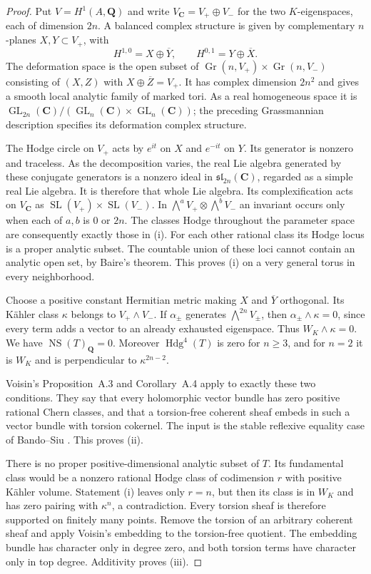\documentclass[11pt]{article}
\theoremstyle{definition}
\theoremstyle{remark}
\newcommand{\Q}{\mathbf Q}
\newcommand{\C}{\mathbf C}
\begin{document}
\begin{proof}
Put $V=H^1(A,\Q)$ and write
$V_\C=V_+\oplus V_-$ for the two $K$-eigenspaces, each of
dimension $2n$.  A balanced complex structure is given by
complementary $n$-planes $X,Y\subset V_+$, with
\[
 H^{1,0}=X\oplus\overline Y,
 \qquad H^{0,1}=Y\oplus\overline X.
\]
The deformation space is the open subset of
$\operatorname{Gr}(n,V_+)\times\operatorname{Gr}(n,V_-)$
consisting of $(X,Z)$ with $X\oplus\overline Z=V_+$.
It has complex dimension $2n^2$ and gives a smooth local analytic
family of marked tori.  As a real homogeneous space it is
$\operatorname{GL}_{2n}(\C)/
(\operatorname{GL}_n(\C)\times\operatorname{GL}_n(\C))$;
the preceding Grassmannian description specifies its deformation
complex structure.

The Hodge circle on $V_+$ acts by $e^{it}$ on $X$ and $e^{-it}$
on $Y$.  Its generator is nonzero and traceless.  As the
decomposition varies, the real Lie algebra generated by these
conjugate generators is a nonzero ideal in
$\mathfrak{sl}_{2n}(\C)$, regarded as a simple real Lie algebra.
It is therefore that whole Lie algebra.  Its complexification
acts on $V_\C$ as
$\operatorname{SL}(V_+)\times\operatorname{SL}(V_-)$.
In $\bigwedge^a V_+\otimes\bigwedge^b V_-$ an invariant occurs
only when each of $a,b$ is $0$ or $2n$.  The classes Hodge
throughout the parameter space are consequently exactly those
in (i).  For each other rational class its Hodge locus is a
proper analytic subset.  The countable union of these loci
cannot contain an analytic open set, by Baire's theorem.
This proves (i) on a very general torus in every neighborhood.

Choose a positive constant Hermitian metric making $X$ and
$\overline Y$ orthogonal.  Its Kähler class $\kappa$ belongs
to $V_+\wedge V_-$.  If $\alpha_\pm$ generates
$\bigwedge^{2n}V_\pm$, then
$\alpha_\pm\wedge\kappa=0$, since every term adds a vector
to an already exhausted eigenspace.  Thus $W_K\wedge\kappa=0$.
We have $\operatorname{NS}(T)_\Q=0$.  Moreover
$\operatorname{Hdg}^4(T)$ is zero for $n\ge3$, and for $n=2$
it is $W_K$ and is perpendicular to $\kappa^{2n-2}$.

Voisin's Proposition~A.3 and Corollary~A.4
\cite[pp.~1072--1074]{VoisinKahler} apply to exactly these two
conditions.  They say that every holomorphic vector bundle has
zero positive rational Chern classes, and that a torsion-free
coherent sheaf embeds in such a vector bundle with torsion
cokernel.  The input is the stable reflexive equality case of
Bando--Siu \cite[Theorem~3 and Corollary~3, p.~40]{BandoSiu}.
This proves (ii).

There is no proper positive-dimensional analytic subset of $T$.
Its fundamental class would be a nonzero rational Hodge class
of codimension $r$ with positive Kähler volume.  Statement (i)
leaves only $r=n$, but then its class is in $W_K$ and has
zero pairing with $\kappa^n$, a contradiction.  Every torsion
sheaf is therefore supported on finitely many points.  Remove
the torsion of an arbitrary coherent sheaf and apply Voisin's
embedding to the torsion-free quotient.  The embedding bundle
has character only in degree zero, and both torsion terms have
character only in top degree.  Additivity proves (iii).
\end{proof}
\end{document}
